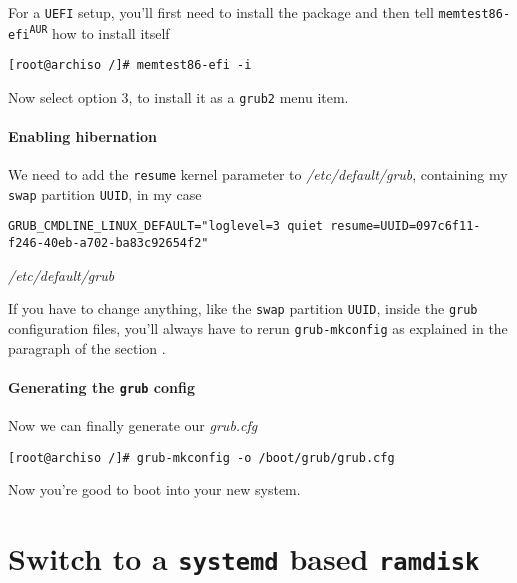 \documentclass[10pt]{dustdoc}
\begin{document}
For a \texttt{UEFI} setup, you’ll first need to install the package and then tell \texttt{memtest86-efi\textsuperscript{\texttt{AUR}}} how to install itself

\begin{verbatim}
[root@archiso /]# memtest86-efi -i
\end{verbatim}

Now select option 3, to install it as a \texttt{grub2} menu item.

\paragraph{Enabling hibernation}
\label{par:enabling-hibernation}

We need to add the \texttt{resume} kernel parameter to \textit{/etc/default/grub}, containing my \texttt{swap} partition \texttt{UUID}, in my case

\begin{mintedlisting}
    \begin{verbatim}
GRUB_CMDLINE_LINUX_DEFAULT="loglevel=3 quiet resume=UUID=097c6f11-f246-40eb-a702-ba83c92654f2"
    \end{verbatim}

    \caption{\textit{/etc/default/grub}}
\end{mintedlisting}

\begin{NOTE}
    If you have to change anything, like the \texttt{swap} partition \texttt{UUID}, inside the \texttt{grub} configuration files, you’ll always have to rerun \texttt{grub-mkconfig} as explained in the paragraph  of the section .
\end{NOTE}

\paragraph{Generating the \texttt{grub} config}
\label{par:generating-the-grub-config}

Now we can finally generate our \textit{grub.cfg}

\begin{verbatim}
[root@archiso /]# grub-mkconfig -o /boot/grub/grub.cfg
\end{verbatim}

Now you’re good to boot into your new system.

\section{Switch to a \texttt{systemd} based \texttt{ramdisk}}
\label{sec:switch-to-a-systemd-based-ramdisk}
\end{document}
